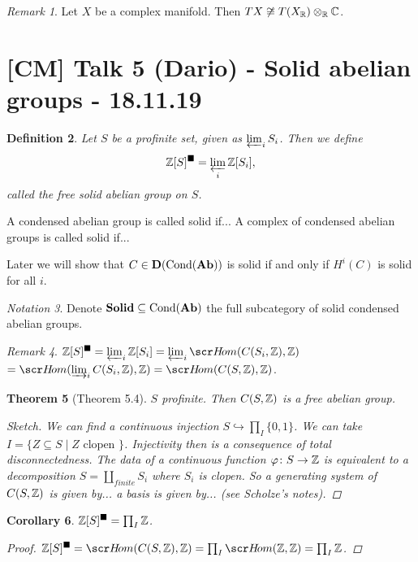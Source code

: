 \documentclass[A4paper, british, reqno]{amsart}
\theoremstyle{darkgreentheorem}
\newtheorem{thm}{Theorem}[section]
\newtheorem{cor}[thm]{Corollary}
\theoremstyle{darkbluedefinition}
\newtheorem{defn}[thm]{Definition}
\theoremstyle{darkredexample}
\theoremstyle{remark}
\newtheorem{rem}[thm]{Remark}
\newtheorem{nota}[thm]{Notation}
\DeclareMathOperator{\Cond}{Cond}
\newcommand{\Solid}{\mathbf{Solid}}
\newcommand{\1}{\mathbbm{1}}
\newcommand{\ot}{\otimes}
\newcommand{\sub}{\subseteq}
\newcommand{\mono}{\hookrightarrow}
\newcommand{\solid}{^{\blacksquare}}
\begin{document}
\begin{rem}
    Let $X$ be a complex manifold.
    Then $TX\not\cong T(X_{\R})\ot_{\R}\C$.
\end{rem}

\section{[CM] Talk 5 (Dario) - Solid abelian groups - 18.11.19}

\begin{defn}
    Let $S$ be a profinite set, given as $\varprojlim_{i} S_{i}$.
    Then we define
    \[ \Z[S]\solid=\varprojlim_{i}\Z[S_{i}],\]
    called the free solid abelian group on $S$.
\end{defn}

A condensed abelian group is called solid if...
A complex of condensed abelian groups is called solid if...

Later we will show that $C\in \D(\Cond(\Ab))$ is solid if and only if $H^{i}(C)$ is solid for all $i$.

\begin{nota}
    Denote $\Solid\sub \Cond(\Ab)$ the full subcategory of solid condensed abelian groups.
\end{nota}

\begin{rem}
    $\Z[S]\solid=\varprojlim_{i}\Z[S_{i}]=\varprojlim_{i}\hom(C(S_{i},\Z),\Z)$$=\hom(\varinjlim_{i}C(S_{i},\Z),\Z)=\hom(C(S,\Z),\Z)$.
\end{rem}

\begin{thm}[Theorem 5.4]
    $S$ profinite.
    Then $C(S,\mathbb{Z})$ is a free abelian group.
    \begin{proof}[Sketch]
	We can find a continuous injection $S\mono \prod_{I}\{0,1\}$.
	We can take $I=\{ Z \sub S\mid Z\text{ clopen }\}$.
	Injectivity then is a consequence of total disconnectedness.
	The data of a continuous function $\varphi\colon S\to \mathbb{Z}$ is equivalent to a decomposition $S=\coprod_{finite}S_{i}$ where $S_{i}$ is clopen.
	So a generating system of $C(S,\mathbb{Z})$ is given by... a basis is given by... (see Scholze's notes).
    \end{proof}
\end{thm}

\begin{cor}
    $\Z[S]\solid=\prod_{I}\Z$.
    \begin{proof}
	$\Z[S]\solid=\hom(C(S,\Z),\Z)=\prod_{I}\hom(\Z,\Z)=\prod_{I}\Z$.
    \end{proof}
\end{cor}
\end{document}
